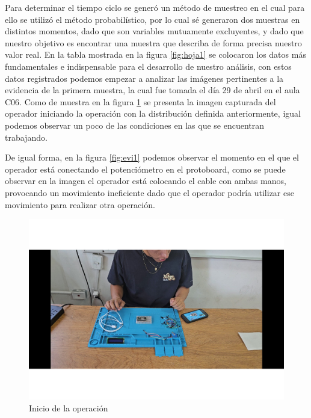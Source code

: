     
    Para determinar el tiempo ciclo se generó un método de muestreo en el cual para ello se utilizó el método probabilístico, por lo cual sé generaron dos muestras en distintos momentos, dado que son variables mutuamente excluyentes, y dado que nuestro objetivo es encontrar una muestra que describa de forma precisa nuestro valor real. En la tabla mostrada en la figura \ref{fig:hoja1} se colocaron los datos más fundamentales e indispensable para el desarrollo de nuestro análisis, con estos datos registrados podemos empezar a analizar las imágenes pertinentes a la evidencia de la primera muestra, la cual fue tomada el día 29 de abril en el aula C06. Como de muestra en la figura \ref{fig:evi0} se presenta la imagen capturada del operador iniciando la operación con la distribución definida anteriormente, igual podemos observar un poco de las condiciones en las que se encuentran trabajando. 
    
    
    
    De igual forma, en la figura \ref{fig:evi1} podemos observar el momento en  el que el operador está conectando el potenciómetro en el protoboard, como se puede observar en la imagen el operador está colocando el cable con ambas manos, provocando un movimiento ineficiente dado que el operador podría utilizar ese movimiento para realizar otra operación.
    
    
    \begin{figure}[H]
        \centering
        \includegraphics[trim = {25mm 40mm 25mm 10mm},clip,scale=0.3]{22/Img/e1.pdf}
        \caption{Inicio de la operación}
        \label{fig:evi0}
    \end{figure}
    
